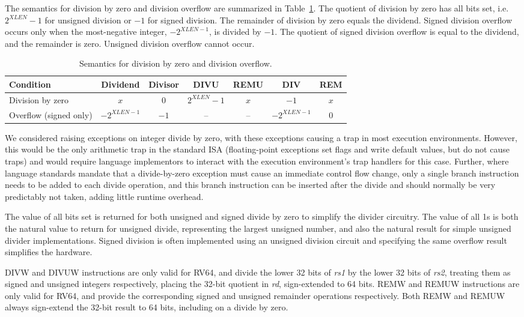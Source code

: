 The semantics for division by zero and division overflow are
summarized in Table~\ref{tab:divby0}.  The quotient of division by
zero has all bits set, i.e. $2^{XLEN}-1$ for unsigned division or $-1$
for signed division.  The remainder of division by zero equals the
dividend.  Signed division overflow occurs only when the most-negative
integer, $-2^{XLEN-1}$, is divided by $-1$.  The quotient of signed
division overflow is equal to the dividend, and the remainder is zero.
Unsigned division overflow cannot occur.

\vspace{0.1in}
\begin{table}[h]
\center
\begin{tabular}{|l|c|c||c|c|c|c|}
\hline
Condition              & Dividend      & Divisor & DIVU         & REMU & DIV           & REM  \\ \hline
Division by zero       & $x$           & 0       & $2^{XLEN}-1$ & $x$  & $-1$          & $x$  \\
Overflow (signed only) & $-2^{XLEN-1}$ & $-1$    & --           & --   & $-2^{XLEN-1}$ & 0    \\
\hline
\end{tabular}
\caption{Semantics for division by zero and division overflow.}
\label{tab:divby0}
\end{table}

\begin{commentary}
We considered raising exceptions on integer divide by zero, with these
exceptions causing a trap in most execution environments.  However,
this would be the only arithmetic trap in the standard ISA
(floating-point exceptions set flags and write default values, but do
not cause traps) and would require language implementors to interact
with the execution environment's trap handlers for this case.
Further, where language standards mandate that a divide-by-zero
exception must cause an immediate control flow change, only a single
branch instruction needs to be added to each divide operation, and
this branch instruction can be inserted after the divide and should
normally be very predictably not taken, adding little runtime
overhead.

The value of all bits set is returned for both unsigned and signed
divide by zero to simplify the divider circuitry.  The value of all 1s
is both the natural value to return for unsigned divide, representing
the largest unsigned number, and also the natural result for simple
unsigned divider implementations.  Signed division is often
implemented using an unsigned division circuit and specifying the same
overflow result simplifies the hardware.
\end{commentary}

DIVW and DIVUW instructions are only valid for RV64, and divide the
lower 32 bits of {\em rs1} by the lower 32 bits of {\em rs2}, treating
them as signed and unsigned integers respectively, placing the 32-bit
quotient in {\em rd}, sign-extended to 64 bits.  REMW and REMUW
instructions are only valid for RV64, and provide the corresponding
signed and unsigned remainder operations respectively. Both REMW and
REMUW always sign-extend the 32-bit result to 64 bits, including on a
divide by zero.

